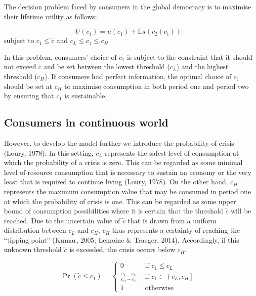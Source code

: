 \documentclass[11pt,preprint, authoryear]{elsarticle}
\numberwithin{equation}{section}
\numberwithin{figure}{section}
\numberwithin{table}{section}
\begin{document}
The decision problem faced by consumers in the global democracy is to
maximise their lifetime utility as follows:

\[
U\left(c_1\right)=u\left(c_1\right)+\mathbb{E} u\left(c_2\left(c_1\right)\right)
\] subject to \(c_1 \leq \tilde{c}\) and \(c_L \leq c_1 \leq c_H\)

In this problem, consumers' choice of \(c_1\) is subject to the
constraint that it should not exceed \(\tilde{c}\) and be set between
the lowest threshold (\(c_L\)) and the highest threshold (\(c_H\)). If
consumers had perfect information, the optimal choice of \(c_1\) should
be set at \(c_H\) to maximise consumption in both period one and period
two by ensuring that \(c_1\) is sustainable.

\hypertarget{consumers-in-continuous-world}{%
\subsection*{Consumers in continuous
world}\label{consumers-in-continuous-world}}

However, to develop the model further we introduce the probability of
crisis (Loury, 1978). In this setting, \(c_L\) represents the safest
level of consumption at which the probability of a crisis is zero. This
can be regarded as some minimal level of resource consumption that is
necessary to sustain an economy or the very least that is required to
continue living (Loury, 1978). On the other hand, \(c_H\) represents the
maximum consumption value that may be consumed in period one at which
the probability of crisis is one. This can be regarded as some upper
bound of consumption possibilities where it is certain that the
threshold \(\tilde{c}\) will be reached. Due to the uncertain value of
\(\tilde{c}\) that is drawn from a uniform distribution between \(c_L\)
and \(c_H\), \(c_H\) thus represents a certainty of reaching the
``tipping point'' (Kumar, 2005; Lemoine \& Traeger, 2014). Accordingly,
if this unknown threshold \(\tilde{c}\) is exceeded, the crisis occurs
below \(c_H\).

\[
\operatorname{Pr}\left(\tilde{c} \leq c_1\right)=\left\{\begin{array}{cc}
0 & \text { if } c_1 \leq c_L \\
\frac{c_1-c_L}{c_H-c_L} & \text { if } c_1 \in\left(c_L, c_H\right] \\
1 & \text { otherwise }
\end{array}\right.
\]
\end{document}
